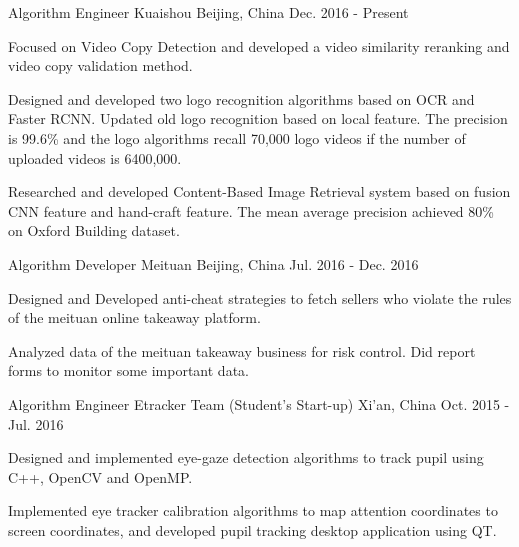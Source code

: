 

\begin{cventries}

  \cventry
    {Algorithm Engineer} %
    {Kuaishou} %
    {Beijing, China} %
    {Dec. 2016 - Present} %
    {
      \begin{cvitems} %
        \item {Focused on Video Copy Detection and developed a video similarity reranking and video copy validation method.}
        \item {Designed and developed two logo recognition algorithms based on OCR and Faster RCNN. Updated old logo recognition based on local feature. The precision is 99.6\% and the logo algorithms recall 70,000 logo videos if the number of uploaded videos is 6400,000.}
        \item {Researched and developed Content-Based Image Retrieval system based on fusion CNN feature and hand-craft feature. The mean average precision achieved 80\% on Oxford Building dataset.}
      \end{cvitems}
    }

  \cventry
    {Algorithm Developer} %
    {Meituan} %
    {Beijing, China} %
    {Jul. 2016 - Dec. 2016} %
    {
      \begin{cvitems} %
        \item {Designed and Developed anti-cheat strategies to fetch sellers who violate the rules of the meituan online takeaway platform.}
        \item {Analyzed data of the meituan takeaway business for risk control. Did report forms to monitor some important data.}
      \end{cvitems}
    }

  \cventry
    {Algorithm Engineer} %
    {Etracker Team (Student's Start-up)} %
    {Xi'an, China} %
    {Oct. 2015 - Jul. 2016} %
    {
      \begin{cvitems} %
        \item {Designed and implemented eye-gaze detection algorithms to track pupil using C++, OpenCV and OpenMP.}
        \item {Implemented eye tracker calibration algorithms to map attention coordinates to screen coordinates, and developed pupil tracking desktop application using QT.}
      \end{cvitems}
    }


\end{cventries}
